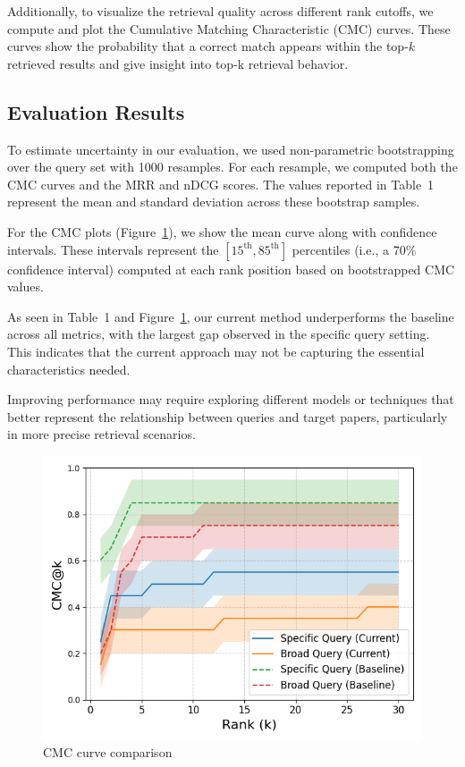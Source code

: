 \documentclass[fleqn,moreauthors,10pt]{ds_report}
\begin{document}
Additionally, to visualize the retrieval quality across different rank cutoffs, we compute and plot the Cumulative Matching Characteristic (CMC) curves.
These curves show the probability that a correct match appears within the top-$k$ retrieved results and give insight into top-k retrieval behavior.

\subsection*{Evaluation Results}

To estimate uncertainty in our evaluation, we used non-parametric bootstrapping over the query set with 1000 resamples. 
For each resample, we computed both the CMC curves and the MRR and nDCG scores.
The values reported in Table~1 represent the mean and standard deviation across these bootstrap samples.

For the CMC plots (Figure~\ref{fig:cmc}), we show the mean curve along with confidence intervals.
These intervals represent the $[15^\text{th}, 85^\text{th}]$ percentiles (i.e., a 70\% confidence interval)
computed at each rank position based on bootstrapped CMC values.

As seen in Table~1 and Figure~\ref{fig:cmc}, our current method underperforms the baseline across all metrics,
with the largest gap observed in the specific query setting.
This indicates that the current approach may not be capturing the essential characteristics needed.

Improving performance may require exploring different models or techniques that better represent
the relationship between queries and target papers, particularly in more precise retrieval scenarios.

\begin{figure}[h]
    \centering
    \includegraphics[width=\columnwidth]{fig/cmc.png}
    \caption{CMC curve comparison}
    \label{fig:cmc}
\end{figure}
\end{document}
